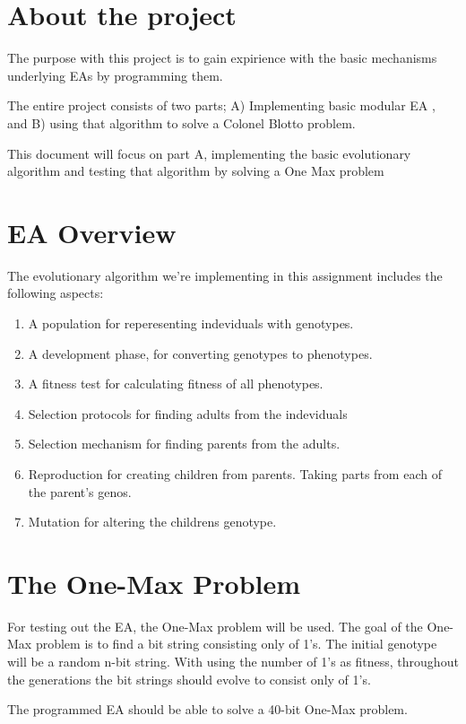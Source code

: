 \section{About the project}
The purpose with this project is to gain expirience with the basic mechanisms underlying EAs
by programming them.

The entire project consists of two parts; A) Implementing basic modular EA , and B) using that 
algorithm to solve a Colonel Blotto problem.  

This document will focus on part A, implementing the basic evolutionary algorithm and testing
that algorithm by solving a One Max problem

\section{EA Overview}
The evolutionary algorithm we're implementing in this assignment includes the following aspects:

\begin{enumerate}

	\item A population for reperesenting indeviduals with genotypes.
	
	\item A development phase, for converting genotypes to phenotypes.
	
	\item A fitness test for calculating fitness of all phenotypes.
	
	\item Selection protocols for finding adults from the indeviduals
	
	\item Selection mechanism for finding parents from the adults. 
	
	\item Reproduction for creating children from parents. Taking parts from each of the parent's genos. 
	
	\item Mutation for altering the childrens genotype. 

\end{enumerate}


\section{The One-Max Problem}

For testing out the EA, the One-Max problem will be used. The goal of the One-Max problem is to find a 
bit string consisting only of 1's. The initial genotype will be a random n-bit string. With using the number
of 1's as fitness, throughout the generations the bit strings should evolve to consist only of 1's. 

The programmed EA should be able to solve a 40-bit One-Max problem. 